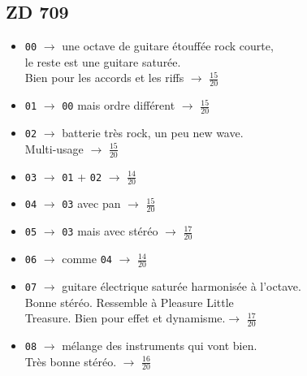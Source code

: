 \documentclass[a4paper, 13pt]{article}
\begin{document}
\subsection*{ZD 709}
\begin{itemize}
    \item \texttt{00} $\rightarrow$ une octave de guitare étouffée rock courte, \\ le reste est une guitare saturée. \\Bien pour les accords et les riffs $\rightarrow$ \Large{$\frac{15}{20}$} \normalsize \vspace{0.2cm}
    \item \texttt{01} $\rightarrow$ \texttt{00} mais ordre différent $\rightarrow$ \Large{$\frac{15}{20}$} \normalsize \vspace{0.2cm}
    \item \texttt{02} $\rightarrow$ batterie très rock, un peu new wave. \\ Multi-usage $\rightarrow$ \Large{$\frac{15}{20}$} \normalsize \vspace{0.2cm}
    \item \texttt{03} $\rightarrow$ \texttt{01} + \texttt{02} $\rightarrow$ \Large{$\frac{14}{20}$} \normalsize \vspace{0.2cm}
    \item \texttt{04} $\rightarrow$ \texttt{03} avec pan $\rightarrow$ \Large{$\frac{15}{20}$} \normalsize \vspace{0.2cm}
    \item \texttt{05} $\rightarrow$ \texttt{03} mais avec stéréo $\rightarrow$ \Large{$\frac{17}{20}$} \normalsize \vspace{0.2cm}
    \item \texttt{06} $\rightarrow$ comme \texttt{04} $\rightarrow$ \Large{$\frac{14}{20}$} \normalsize \vspace{0.2cm}
    \item \texttt{07} $\rightarrow$ guitare électrique saturée harmonisée à l'octave.\\ Bonne stéréo. Ressemble à Pleasure Little \\ Treasure. Bien pour effet et dynamisme.$\rightarrow$ \Large{$\frac{17}{20}$} \normalsize \vspace{0.2cm}
    \item \texttt{08} $\rightarrow$ mélange des instruments qui vont bien. \\ Très bonne stéréo. $\rightarrow$ \Large{$\frac{16}{20}$} \normalsize \vspace{0.2cm}

\end{itemize}
\end{document}
